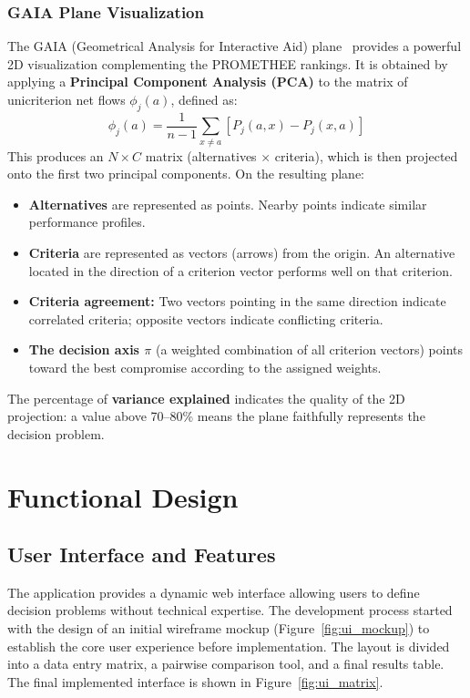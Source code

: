\documentclass[12pt,a4paper,oneside]{report}
\begin{document}
\subsection{GAIA Plane Visualization}
The GAIA (Geometrical Analysis for Interactive Aid) plane~\cite{mareschal2013} provides a powerful 2D visualization complementing the PROMETHEE rankings. It is obtained by applying a \textbf{Principal Component Analysis (PCA)} to the matrix of unicriterion net flows $\phi_j(a)$, defined as:
\begin{equation}
    \phi_j(a) = \frac{1}{n-1} \sum_{x \neq a} \left[ P_j(a, x) - P_j(x, a) \right]
\end{equation}
This produces an $N \times C$ matrix (alternatives $\times$ criteria), which is then projected onto the first two principal components. On the resulting plane:
\begin{itemize}
    \item \textbf{Alternatives} are represented as points. Nearby points indicate similar performance profiles.
    \item \textbf{Criteria} are represented as vectors (arrows) from the origin. An alternative located in the direction of a criterion vector performs well on that criterion.
    \item \textbf{Criteria agreement:} Two vectors pointing in the same direction indicate correlated criteria; opposite vectors indicate conflicting criteria.
    \item \textbf{The decision axis $\pi$} (a weighted combination of all criterion vectors) points toward the best compromise according to the assigned weights.
\end{itemize}
The percentage of \textbf{variance explained} indicates the quality of the 2D projection: a value above 70--80\% means the plane faithfully represents the decision problem.

\chapter{Functional Design}

\section{User Interface and Features}
The application provides a dynamic web interface allowing users to define decision problems without technical expertise. The development process started with the design of an initial wireframe mockup (Figure~\ref{fig:ui_mockup}) to establish the core user experience before implementation. The layout is divided into a data entry matrix, a pairwise comparison tool, and a final results table. The final implemented interface is shown in Figure~\ref{fig:ui_matrix}.
\end{document}
